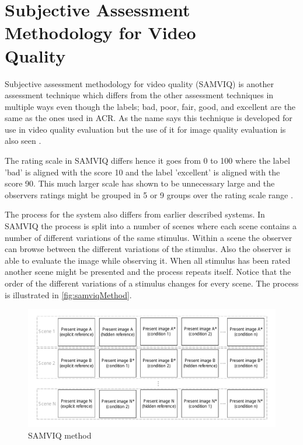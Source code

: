 
\section{Subjective Assessment Methodology for Video \\Quality} %
\label{sec:samviq}

Subjective assessment methodology for video quality (SAMVIQ) is another assessment technique which differs from the other assessment techniques in multiple ways even though the labels; bad, poor, fair, good, and excellent are the same as the ones used in ACR. As the name says this technique is developed for use in video quality evaluation but the use of it for image quality evaluation is also seen \cite{Rouse2010}.

The rating scale in SAMVIQ differs hence it goes from 0 to 100 where the label 'bad' is aligned with the score 10 and the label 'excellent' is aligned with the score 90. This much larger scale has shown to be unnecessary large and the observers ratings might be grouped in 5 or 9 groups over the rating scale range \cite{Rouse2010}.

The process for the system also differs from earlier described systems. In SAMVIQ the process is split into a number of scenes where each scene contains a number of different variations of the same stimulus. Within a scene the observer can browse between the different variations of the stimulus. Also the observer is able to evaluate the image while observing it. When all stimulus has been rated another scene might be presented and the process repeats itself. Notice that the order of the different variations of a stimulus changes for every scene. The process is illustrated in \autoref{fig:samviqMethod}.

\begin{figure}[H]
	\centering
	\includegraphics[width = \columnwidth]{Img/SAMVIQ.pdf}
	\caption{SAMVIQ method}
	\label{fig:samviqMethod}
\end{figure}

